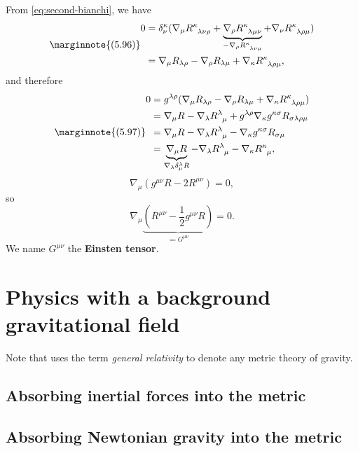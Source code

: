 \documentclass[hyperref, a4paper]{article}
\newcommand*{\concept}[1]{{\textbf{#1}}}
\begin{document}
From \eqref{eq:second-bianchi}, we have 
\[ \marginnote{(5.96)}
    \begin{aligned}
        0 &= \delta^\kappa_\nu (\nabla_\mu R\indices{^\kappa_{\lambda \nu \rho}} + \underbrace{\nabla_\rho R\indices{^\kappa_{\lambda \mu \nu }}}_{- \nabla_\rho R\indices{^\kappa_{\lambda \nu \mu}}} + \nabla_\nu R\indices{^\kappa_{\lambda \rho \mu}}) \\
        &= \nabla_\mu R_{\lambda \rho} - \nabla_\rho R_{\lambda \mu} + \nabla_\kappa R\indices{^\kappa_{\lambda \rho \mu}},
    \end{aligned}
\]
and therefore 
\[ \marginnote{(5.97)}
    \begin{aligned}
        0 &= g^{\lambda \rho} (\nabla_\mu R_{\lambda \rho} - \nabla_\rho R_{\lambda \mu} + \nabla_\kappa R\indices{^\kappa_{\lambda \rho \mu}}) \\
        &= \nabla_\mu R - \nabla_\lambda R\indices{^\lambda_\mu} + g^{\lambda \rho} \nabla_\kappa g^{\kappa \sigma} R_{\sigma \lambda \rho \mu} \\
        &= \nabla_\mu R - \nabla_\lambda R\indices{^\lambda_\mu} - \nabla_\kappa g^{\kappa \sigma} R_{\sigma 
        \mu} \\
        &=  \underbrace{\nabla_\mu R}_{\nabla_\lambda \delta^\lambda_\mu R} - \nabla_\lambda R\indices{^\lambda_\mu} - \nabla_\kappa R\indices{^\kappa_\mu} ,
    \end{aligned}
\]
\[
    \nabla_{\mu} (g^{\mu \nu} R - 2 R^{\mu \nu}) = 0,
\]
so 
\begin{equation}
    \nabla_\mu \underbrace{\left( R^{\mu \nu} - \frac{1}{2} g^{\mu \nu} R \right)}_{\eqqcolon G^{\mu \nu}} = 0.
    \label{eq:einstein-tensor}
\end{equation}
We name $G^{\mu \nu}$ the \concept{Einsten tensor}.

\section{Physics with a background gravitational field}

Note that \cite{bambi2018introduction} uses the term \emph{general relativity} to denote any metric theory of 
gravity. 

\subsection{Absorbing inertial forces into the metric}

\subsection{Absorbing Newtonian gravity into the metric}
\end{document}
